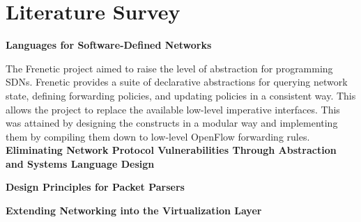 
\section{Literature Survey}

\textbf{Languages for Software-Defined Networks} 

The Frenetic project aimed to raise the level of abstraction for 
programming SDNs. Frenetic provides a suite of declarative abstractions 
for querying network state, defining forwarding policies, and updating 
policies in a consistent way. This allows the project to replace the 
available low-level imperative interfaces. This was attained by designing 
the constructs in a modular way and implementing them by compiling
them down to low-level OpenFlow forwarding rules. \cite{Foster2013} \\

\noindent \textbf{Eliminating Network Protocol Vulnerabilities Through Abstraction and Systems Language Design
}



\cite{Casey2013}

\noindent \textbf{Design Principles for Packet Parsers}
\cite{Gibb2013}

\noindent \textbf{Extending Networking into the Virtualization Layer}
\cite{Pfaff2009}